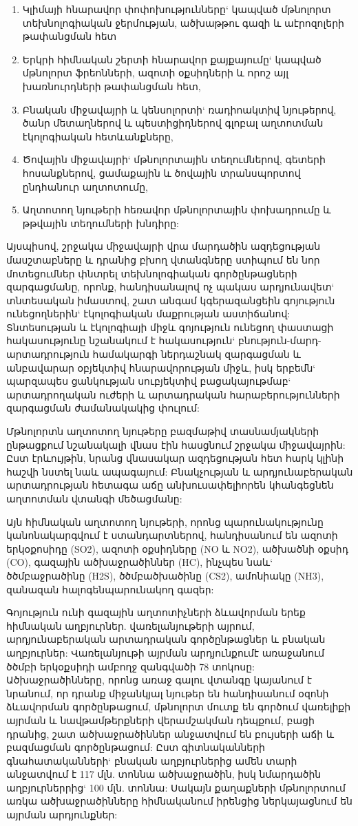 \documentclass[12pt]{article}
\begin{document}
\begin{sloppypar}
\begin{enumerate}
\item Կլիմայի հնարավոր փոփոխությունները` կապված մթնոլորտ տեխնոլոգիական ջերմության, ածխաթթու գազի և աէրոզոլերի թափանցման հետ
\item Երկրի հիմնական շերտի հնարավոր քայքայումը` կապված մթնոլորտ ֆրեոնների, ազոտի օքսիդների և որոշ այլ խառնուրդների թափանցման հետ,
\item Բնական միջավայրի և կենսոլորտի` ռադիոակտիվ նյութերով, ծանր մետաղներով և պեստիցիդներով գլոբալ աղտոտման էկոլոգիական հետևանքները,
\item Ծովային միջավայրի` մթնոլորտային տեղումներով, գետերի հոսանքներով, ցամաքային և ծովային տրանսպորտով ընդհանուր աղտոտումը,
\item Աղտոտող նյութերի հեռավոր մթնոլորտային փոխադրումը և թթվային տեղումների խնդիրը:
\end{enumerate}

Այսպիսով, շրջակա միջավայրի վրա մարդածին ազդեցության մասշտաբները և դրանից բխող վտանգները ստիպում են նոր մոտեցումներ փնտրել տեխնոլոգիական գործընթացների զարգացմանը, որոնք, հանդիսանալով ոչ պակաս արդյունավետ` տնտեսական իմաստով, շատ անգամ կգերազանցեին գոյություն ունեցողներին` էկոլոգիական մաքրության աստիճանով: Տնտեսության և էկոլոգիայի միջև գոյություն ունեցող փաստացի հակասությունը նշանակում է հակասություն` բնություն-մարդ-արտադրություն համակարգի ներդաշնակ զարգացման և անբավարար օբյեկտիվ հնարավորության միջև, իսկ երբեմն` պարզապես ցանկության սուբյեկտիվ բացակայութմաբ` արտադրողական ուժերի և արտադրական հարաբերությունների զարգացման ժամանակակից փուլում:

Մթնոլորտն աղտոտող նյութերը բազմաթիվ տասնամյակների ընթացքում նշանակալի վնաս էին հասցնում շրջակա միջավայրին: Ըստ էրևույթին, նրանց վնասակար ազդեցության հետ հարկ կլինի հաշվի նստել նաև ապագայում: Բնակչության և արդյունաբերական արտադրության հետագա աճը անխուսափելիորեն կհանգեցնեն աղտոտման վտանգի մեծացմանը:

Այն հիմնական աղտոտող նյութերի, որոնց պարունակությունը կանոնակարգվում է ստանդարտներով, հանդիսանում են ազոտի երկօքոսիդը (SO2), ազոտի օքսիդները (NO և NO2), ածխածնի օքսիդ (CO), գազային ածխաջրածիններ (HC), ինչպես նաև` ծծմբաջրածինը (H2S), ծծմբածխածինը (CS2), ամոնիակը (NH3), զանազան հալոգենպարունակող գազեր:

Գոյություն ունի գազային աղտոտիչների ձևավորման երեք հիմնական աղբյուրներ. վառելանյութերի այրում, արդյունաբերական արտադրական գործընթացներ և բնական աղբյուրներ: Վառելանյութի այրման արդյունքումէ առաջանում ծծմբի երկօքսիդի ամբողջ զանգվածի 78 տոկոսը: Ածխաջրածինները, որոնց առաջ գալու վտանգը կայանում է նրանում, որ դրանք միջանկյալ նյութեր են հանդիսանում օզոնի ձևավորման գործընթացում, մթնոլորտ մուտք են գործում վառելիքի այրման և նավթամթերքների վերամշակման դեպքում, բացի դրանից, շատ ածխաջրածիններ անջատվում են բույսերի աճի և բազմացման գործընթացում: Ըստ գիտնականների գնահատականների` բնական աղբյուրներից ամեն տարի անջատվում է 117 մլն. տոննա ածխաջրածին, իսկ նմարդածին աղբյուրներրից` 100 մլն. տոննա: Սակայն քաղաքների մթնոլորտում առկա ածխաջրածինները հիմնականում իրենցից ներկայացնում են այրման արդյունքներ:


\end{sloppypar}
\end{document}
